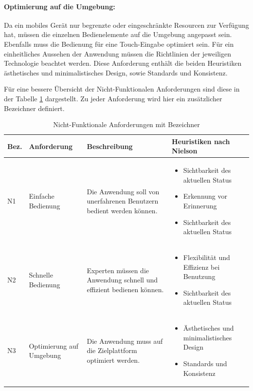 \paragraph{Optimierung auf die Umgebung: } Da ein mobiles Gerät nur begrenzte oder eingeschränkte Resourcen zur Verfügung hat, müssen die einzelnen Bedienelemente auf die Umgebung angepasst sein. Ebenfalls muss die Bedienung für eine Touch-Eingabe optimiert sein. 
Für ein einheitliches Aussehen der Anwendung müssen die Richtlinien der jeweiligen Technologie beachtet werden. Diese Anforderung enthält die beiden Heuristiken ästhetisches und minimalistisches Design, sowie Standards und Konsistenz.

Für eine bessere Übersicht der Nicht-Funktionalen Anforderungen sind diese in der Tabelle \ref{nonFunctionalRequ} dargestellt. Zu jeder Anforderung wird hier ein zusätzlicher Bezeichner definiert.

\begin{table}
\begin{tabular}{| p{0.7cm} | p{2.2cm} | p{4.5cm} | p{5.5cm}|}
\toprule[2pt] \rowcolor{dunkelgrau}
\hline
  Bez. & Anforderung & Beschreibung & Heuristiken nach Nielson \\
  \hline
  N1 & Einfache \newline Bedienung & Die Anwendung soll von unerfahrenen Benutzern bedient werden können.& \begin{itemize}
          \item Sichtbarkeit des aktuellen Status
          \item Erkennung vor Erinnerung
          \item Sichtbarkeit des aktuellen Status
  \end{itemize} \\
  \hline
  N2 & Schnelle \newline Bedienung & Experten müssen die Anwendung schnell und effizient bedienen können. & \begin{itemize}
            \item Flexibilität und Effizienz bei Benutzung
            \item Sichtbarkeit des aktuellen Status
    \end{itemize}  \\
  \hline
    N3 & Optimierung auf Umgebung & Die Anwendung muss auf die Zielplattform optimiert werden. &  \begin{itemize}
              \item Ästhetisches und minimalistisches Design
              \item Standards und Konsistenz
      \end{itemize} \\
    \hline
\bottomrule[2pt]
\end{tabular}
\caption{Nicht-Funktionale Anforderungen mit Bezeichner}
\label{nonFunctionalRequ}
\end{table}

